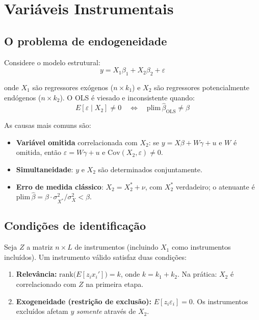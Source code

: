 \chapter{Variáveis Instrumentais}
\label{cap:iv}

\section{O problema de endogeneidade}

Considere o modelo estrutural:
\[
  y = X_1\beta_1 + X_2\beta_2 + \varepsilon
\]

onde $X_1$ são regressores exógenos ($n \times k_1$) e $X_2$ são regressores
potencialmente endógenos ($n \times k_2$). O OLS é viesado e inconsistente
quando:
\[
  E[\varepsilon \mid X_2] \neq 0
  \quad\Longleftrightarrow\quad
  \mathrm{plim}\,\hat{\beta}_{\mathrm{OLS}} \neq \beta
\]

As causas mais comuns são:

\begin{itemize}
  \item \textbf{Variável omitida} correlacionada com $X_2$: se $y = X\beta + W\gamma + u$
        e $W$ é omitida, então $\varepsilon = W\gamma + u$ e $\mathrm{Cov}(X_2, \varepsilon) \neq 0$.
  \item \textbf{Simultaneidade}: $y$ e $X_2$ são determinados conjuntamente.
  \item \textbf{Erro de medida clássico}: $X_2 = X_2^* + \nu$, com $X_2^*$
        verdadeiro; o atenuante é $\mathrm{plim}\,\hat{\beta} = \beta \cdot \sigma_{X^*}^2/\sigma_X^2 < \beta$.
\end{itemize}

\section{Condições de identificação}

Seja $Z$ a matriz $n \times L$ de instrumentos (incluindo $X_1$ como
instrumentos incluídos). Um instrumento válido satisfaz duas condições:

\begin{enumerate}
  \item \textbf{Relevância:}
        $\mathrm{rank}\bigl(E[z_i x_i']\bigr) = k$, onde $k = k_1 + k_2$.
        Na prática: $X_2$ é correlacionado com $Z$ na primeira etapa.

  \item \textbf{Exogeneidade (restrição de exclusão):}
        $E[z_i \varepsilon_i] = 0$.
        Os instrumentos excluídos afetam $y$ \emph{somente} através de $X_2$.
\end{enumerate}

